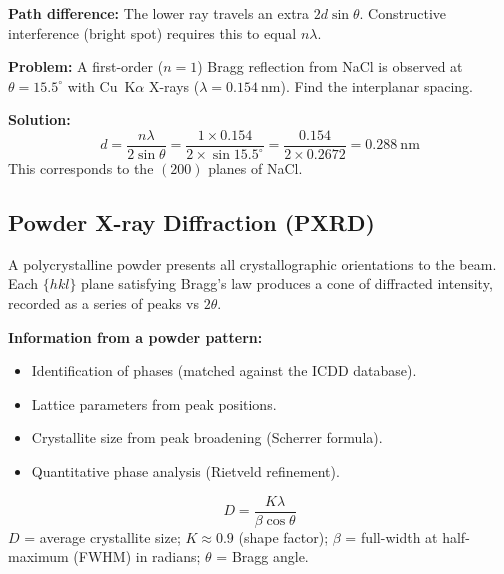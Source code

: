 \documentclass[12pt,a4paper]{article}
\begin{document}
\textbf{Path difference:} The lower ray travels an extra $2d\sin\theta$. Constructive interference (bright spot) requires this to equal $n\lambda$.

\begin{tcolorbox}[examplebox, title={Solved Example: Spacing of NaCl from Bragg Reflection}]
\textbf{Problem:} A first-order ($n=1$) Bragg reflection from NaCl is observed at $\theta=15.5^{\circ}$ with Cu~K$\alpha$ X-rays ($\lambda=0.154\ \mathrm{nm}$). Find the interplanar spacing.

\textbf{Solution:}
\[
d=\frac{n\lambda}{2\sin\theta}=\frac{1\times 0.154}{2\times \sin 15.5^{\circ}}=\frac{0.154}{2\times 0.2672}=0.288\ \mathrm{nm}
\]
This corresponds to the $(200)$ planes of NaCl.
\end{tcolorbox}

\subsection{Powder X-ray Diffraction (PXRD)}
A polycrystalline powder presents all crystallographic orientations to the beam. Each $\{hkl\}$ plane satisfying Bragg's law produces a cone of diffracted intensity, recorded as a series of peaks vs $2\theta$.

\textbf{Information from a powder pattern:}
\begin{itemize}[leftmargin=*, itemsep=1pt, topsep=2pt]
  \item Identification of phases (matched against the ICDD database).
  \item Lattice parameters from peak positions.
  \item Crystallite size from peak broadening (Scherrer formula).
  \item Quantitative phase analysis (Rietveld refinement).
\end{itemize}

\begin{tcolorbox}[formulabox, title={Scherrer Equation for Crystallite Size}]
\[
D=\frac{K\lambda}{\beta\cos\theta}
\]
$D$ = average crystallite size; $K\approx 0.9$ (shape factor); $\beta$ = full-width at half-maximum (FWHM) in radians; $\theta$ = Bragg angle.
\end{tcolorbox}
\end{document}

